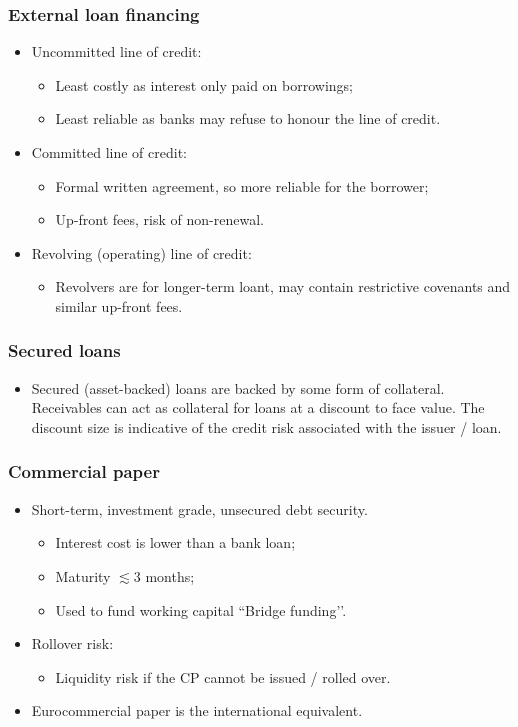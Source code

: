 \documentclass[../notes_compiled.tex]{subfiles}
\begin{document}
\subsubsection*{External loan financing}
\begin{itemize}
\item Uncommitted line of credit:
\begin{itemize}
\item Least costly as interest only paid on borrowings;
\item Least reliable as banks may refuse to honour the line of credit.
\end{itemize}
\item Committed line of credit:
\begin{itemize}
\item Formal written agreement, so more reliable for the borrower;
\item Up-front fees, risk of non-renewal.
\end{itemize}
\item Revolving (operating) line of credit:
\begin{itemize}
\item Revolvers are for longer-term loant, may contain restrictive covenants and similar up-front fees.
\end{itemize}
\end{itemize}

\subsubsection*{Secured loans}
\begin{itemize}
\item Secured (asset-backed) loans are backed by some form of collateral. Receivables can act as collateral for loans at a discount to face value. The discount size is indicative of the credit risk associated with the issuer / loan.
\end{itemize}

\subsubsection*{Commercial paper}
\begin{itemize}
\item Short-term, investment grade, unsecured debt security.
\begin{itemize}
\item Interest cost is lower than a bank loan;
\item Maturity $\lesssim3$ months;
\item Used to fund working capital ``Bridge funding’’.
\end{itemize}
\item Rollover risk:
\begin{itemize}
\item Liquidity risk if the CP cannot be issued / rolled over.
\end{itemize}
\item Eurocommercial paper is the international equivalent.
\end{itemize}
\end{document}
